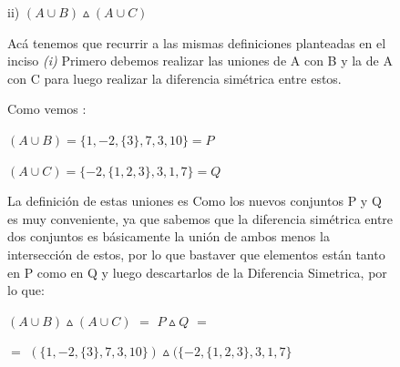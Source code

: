 \documentclass[10pt]{article}
\begin{document}
\begin{ej}
\begin{itemize}
\begin{figure}[H]
\begin{minipage}[b]{0.4\linewidth}

\end{minipage}
\end{figure}

\begin{figure}[H]
\begin{minipage}[b]{0.5\linewidth}

\item[ii)] $(A \cup B)\vartriangle(A \cup C)$

\sffamily Acá tenemos que recurrir a las mismas definiciones planteadas en el inciso \textit{(i)}
Primero debemos realizar las uniones de A con B y la de A con C  para luego realizar la diferencia simétrica entre estos.

Como vemos :

$(A \cup B) = \{ 1,-2, \{3\},7,3,10\} = P$

$(A \cup C) = \{ -2, \{1,2,3\}, 3,1,7 \} = Q$

La definición de estas uniones es Como los nuevos conjuntos P y Q es muy conveniente, ya que sabemos que la diferencia simétrica entre dos conjuntos es básicamente la unión de ambos menos la intersección de estos, por lo que bastaver que elementos están tanto en P como en Q y luego descartarlos de la Diferencia Simetrica, por lo que:

 $(A \cup B)\vartriangle(A \cup C)$ $=$ $P \vartriangle Q $ $=$ 
 
$=$ $ (\{ 1,-2, \{3\},7,3,10\}) \vartriangle (\{ -2, \{1,2,3\}, 3,1,7 \} $


\end{minipage}
\end{figure}
\end{itemize}
\end{ej}
\end{document}
